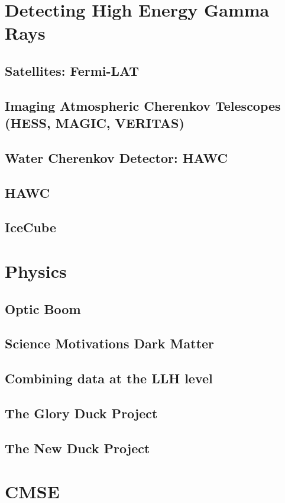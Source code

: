 \documentclass[a4paper, 12pt]{article}
\begin{document}
\section{Detecting High Energy Gamma Rays\label{sec:detect_gamma}}

\subsection{Satellites: Fermi-LAT\label{sec:fermi_gamma}}

\subsection{Imaging Atmospheric Cherenkov Telescopes (HESS, MAGIC, VERITAS)\label{sec:iact_gamme}}

\subsection{Water Cherenkov Detector: HAWC\label{sec:hawc_gamma}}

\subsection{HAWC}
\subsection{IceCube}

\section{Physics}
\subsection{Optic Boom}
\subsection{Science Motivations Dark Matter}
\subsection{Combining data at the LLH level}
\subsection{The Glory Duck Project}
\subsection{The New Duck Project}

\section{CMSE}
\end{document}
